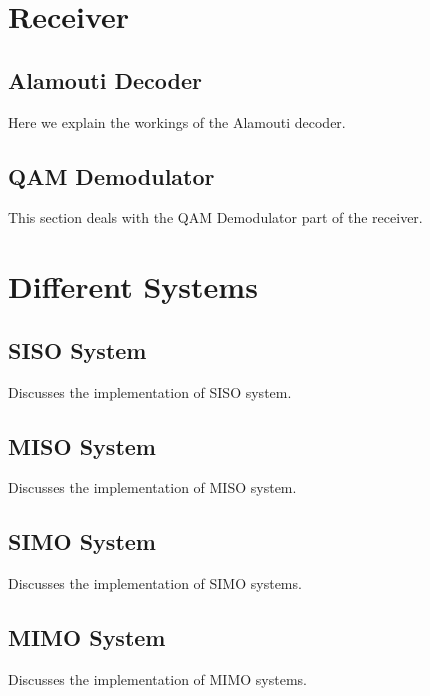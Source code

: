 \section{Receiver}

\subsection{Alamouti Decoder}
Here we explain the workings of the Alamouti decoder.

\subsection{QAM Demodulator}
This section deals with the QAM Demodulator part of the receiver.


\section{Different Systems}
\subsection{SISO System}
Discusses the implementation of SISO system.

\subsection{MISO System}
Discusses the implementation of MISO system.

\subsection{SIMO System}
Discusses the implementation of SIMO systems.

\subsection{MIMO System}
Discusses the implementation of MIMO systems.
 